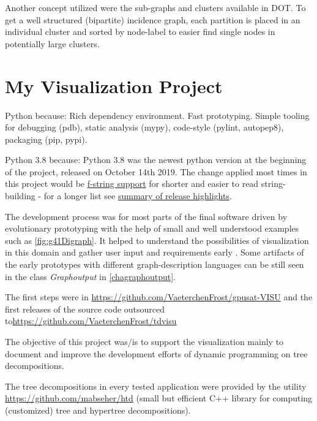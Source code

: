 \documentclass[a4paper, 12pt, bibliography=totoc]{scrartcl}
\begin{document}
Another concept utilized were the sub-graphs and clusters available in DOT.
To get a well structured (bipartite) incidence graph, each partition is placed in an individual cluster
and sorted by node-label to easier find single nodes in potentially large clusters.


\newpage
\section{My Visualization Project}


Python because: Rich dependency environment. Fast prototyping. Simple tooling for debugging (pdb), static analysis (mypy), code-style (pylint, autopep8), packaging (pip, pypi).

Python 3.8 because: Python 3.8 was the newest python version at the beginning of the project, released on October 14th 2019. The change applied most times in this project would be \href{https://docs.python.org/3/whatsnew/3.8.html#f-strings-support-for-self-documenting-expressions-and-debugging}{f-string support} for shorter and easier to read string-building - for a longer list see \href{https://docs.python.org/3/whatsnew/3.8.html}{summary of release highlights}.

The development process was for most parts of the final software driven by evolutionary prototyping with the help of small and well understood examples such as \ref{fig:g41Digraph}. It helped to understand the possibilities of visualization in this domain and gather user input and requirements early \cite{rapidPrototypingOvermyer}. Some artifacts of the early prototypes with different graph-description languages can be still seen in the class \textit{Graphoutput} in \ref{chagraphoutput}.

The first steps were in \url{https://github.com/VaeterchenFrost/gpusat-VISU} and the first releases of the source code outsourced to\url{https://github.com/VaeterchenFrost/tdvisu}

The objective of this project was/is to support the visualization mainly to document and improve the development efforts of dynamic programming on tree decompositions.

The tree decompositions in every tested application were provided by the utility \url{https://github.com/mabseher/htd} (small but efficient C++ library for computing (customized) tree and hypertree decompositions).
\end{document}
